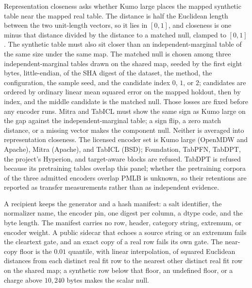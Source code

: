 \documentclass{article}
\begin{document}
Representation closeness asks whether Kumo large places the mapped synthetic table near the mapped real table. The distance is half the Euclidean length between the two unit-length vectors, so it lies in $[0,1]$, and closeness is one minus that distance divided by the distance to a matched null, clamped to $[0,1]$. The synthetic table must also sit closer than an independent-marginal table of the same size under the same map. The matched null is chosen among three independent-marginal tables drawn on the shared map, seeded by the first eight bytes, little-endian, of the SHA digest of the dataset, the method, the configuration, the sample seed, and the candidate index $0$, $1$, or $2$; candidates are ordered by ordinary linear mean squared error on the mapped holdout, then by index, and the middle candidate is the matched null. Those losses are fixed before any encoder runs. Mitra and TabICL must show the same sign as Kumo large on the gap against the independent-marginal table; a sign flip, a zero match distance, or a missing vector makes the component null. Neither is averaged into representation closeness. The licensed encoder set is Kumo large (OpenMDW and Apache), Mitra (Apache), and TabICL (BSD); Foundation, TabPFN, TabDPT, the project's Hyperion, and target-aware blocks are refused. TabDPT is refused because its pretraining tables overlap this panel; whether the pretraining corpora of the three admitted encoders overlap PMLB is unknown, so their retentions are reported as transfer measurements rather than as independent evidence.

A recipient keeps the generator and a hash manifest: a salt identifier, the normalizer name, the encoder pin, one digest per column, a dtype code, and the byte length. The manifest carries no row, header, category string, extremum, or encoder weight. A public sidecar that echoes a source string or an extremum fails the cleartext gate, and an exact copy of a real row fails its own gate. The near-copy floor is the $0.01$ quantile, with linear interpolation, of squared Euclidean distances from each distinct real fit row to the nearest other distinct real fit row on the shared map; a synthetic row below that floor, an undefined floor, or a charge above $10{,}240$ bytes makes the scalar null.
\end{document}
